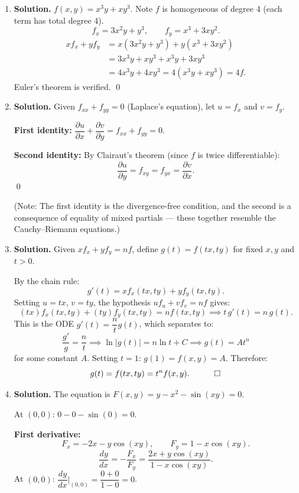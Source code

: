 \begin{enumerate}
Since this limit does not equal 0, $f$ is not differentiable at $(0,0)$. \qed

\item \textbf{Solution.}
$f(x,y) = x^3y + xy^3$. Note $f$ is homogeneous of degree 4 (each term has total degree 4).
\[
f_x = 3x^2y + y^3, \qquad f_y = x^3 + 3xy^2.
\]
\begin{align*}
xf_x + yf_y &= x(3x^2y + y^3) + y(x^3 + 3xy^2) \\
&= 3x^3y + xy^3 + x^3y + 3xy^3 \\
&= 4x^3y + 4xy^3 = 4(x^3y + xy^3) = 4f.
\end{align*}
Euler's theorem is verified. \qed

\item \textbf{Solution.}
Given $f_{xx} + f_{yy} = 0$ (Laplace's equation), let $u = f_x$ and $v = f_y$.

\textbf{First identity:} $\dfrac{\partial u}{\partial x} + \dfrac{\partial v}{\partial y} = f_{xx} + f_{yy} = 0$.

\textbf{Second identity:} By Clairaut's theorem (since $f$ is twice differentiable):
\[
\frac{\partial u}{\partial y} = f_{xy} = f_{yx} = \frac{\partial v}{\partial x}.
\]
\qed

(Note: The first identity is the divergence-free condition, and the second is a consequence of equality of mixed partials --- these together resemble the Cauchy--Riemann equations.)

\item \textbf{Solution.}
Given $xf_x + yf_y = nf$, define $g(t) = f(tx, ty)$ for fixed $x,y$ and $t > 0$.

By the chain rule:
\[
g'(t) = xf_x(tx,ty) + yf_y(tx,ty).
\]
Setting $u = tx$, $v = ty$, the hypothesis $uf_u + vf_v = nf$ gives:
\[
(tx)f_x(tx,ty) + (ty)f_y(tx,ty) = nf(tx,ty) \implies t\,g'(t) = n\,g(t).
\]
This is the ODE $g'(t) = \dfrac{n}{t}g(t)$, which separates to:
\[
\frac{g'}{g} = \frac{n}{t} \implies \ln|g(t)| = n\ln t + C \implies g(t) = At^n
\]
for some constant $A$. Setting $t = 1$: $g(1) = f(x,y) = A$. Therefore:
\[
g(t) = f(tx,ty) = t^n f(x,y). \quad \qed
\]

\item \textbf{Solution.}
The equation is $F(x,y) = y - x^2 - \sin(xy) = 0$.

At $(0,0)$: $0 - 0 - \sin(0) = 0$.

\textbf{First derivative:}
\[
F_x = -2x - y\cos(xy), \qquad F_y = 1 - x\cos(xy).
\]
\[
\frac{dy}{dx} = -\frac{F_x}{F_y} = \frac{2x + y\cos(xy)}{1 - x\cos(xy)}.
\]
At $(0,0)$: $\dfrac{dy}{dx}\Big|_{(0,0)} = \dfrac{0 + 0}{1 - 0} = \boxed{0}$.


\end{enumerate}
